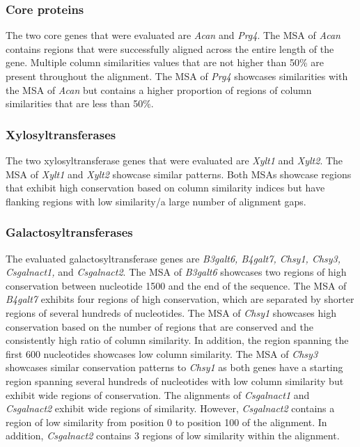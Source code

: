 \documentclass{article}
\begin{document}
\subsubsection*{Core proteins}
The two core genes that were evaluated are \textit{Acan} and \textit{Prg4}. The MSA of \textit{Acan} contains regions that were successfully aligned across the entire length of the gene. Multiple column similarities values that are not higher than 50\% are present throughout the alignment. The MSA of \textit{Prg4} showcases similarities with the MSA of \textit{Acan} but contains a higher proportion of regions of column similarities that are less than 50\%.

\subsubsection*{Xylosyltransferases}
The two xylosyltransferase genes that were evaluated are \textit{Xylt1} and \textit{Xylt2}. The MSA of \textit{Xylt1} and \textit{Xylt2} showcase similar patterns. Both MSAs showcase regions that exhibit high conservation based on column similarity indices but have flanking regions with low similarity/a large number of alignment gaps.

\subsubsection*{Galactosyltransferases}
The evaluated galactosyltransferase genes are \textit{B3galt6, B4galt7, Chsy1, Chsy3, Csgalnact1,} and \textit{Csgalnact2}. The MSA of \textit{B3galt6} showcases two regions of high conservation between nucleotide 1500 and the end of the sequence. The MSA of \textit{B4galt7} exhibits four regions of high conservation, which are separated by shorter regions of several hundreds of nucleotides. The MSA of \textit{Chsy1} showcases high conservation based on the number of regions that are conserved and the consistently high ratio of column similarity. In addition, the region spanning the first 600 nucleotides showcases low column similarity. The MSA of \textit{Chsy3} showcases similar conservation patterns to \textit{Chsy1} as both genes have a starting region spanning several hundreds of nucleotides with low column similarity but exhibit wide regions of conservation. The alignments of \textit{Csgalnact1} and \textit{Csgalnact2} exhibit wide regions of similarity. However, \textit{Csgalnact2} contains a region of low similarity from position 0 to position 100 of the alignment. In addition, \textit{Csgalnact2} contains 3 regions of low similarity within the alignment. 
\end{document}
